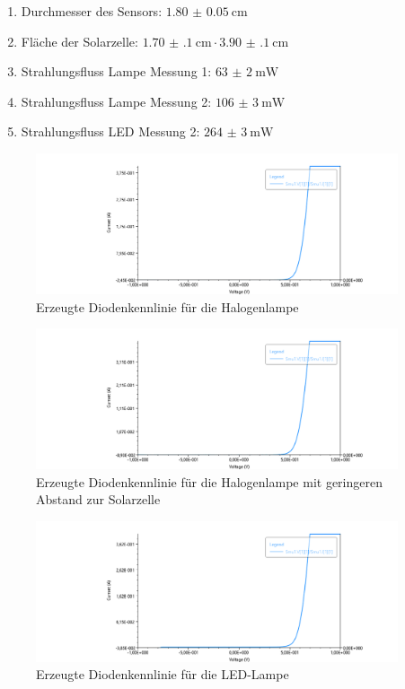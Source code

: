 \documentclass[12pt,english,ngerman]{scrartcl}
\begin{document}
\begin{enumerate}\label{enum:werte_solarzelle2}
	\item Durchmesser des Sensors: $\SI{1.80(5)}{\cm}$\cite{noauthor_2450_nodate}
	\item Fläche der Solarzelle: $\SI{1.70(10)}{\cm}\cdot \SI{3.90(10)}{\cm}$
	\item Strahlungsfluss Lampe Messung 1: $\SI{63(2)}{\milli\watt}$
	\item Strahlungsfluss Lampe Messung 2: $\SI{106(3)}{\milli\watt}$
	\item Strahlungsfluss LED Messung 2: $\SI{264(3)}{\milli\watt}$
\end{enumerate}

\begin{figure}[H]
	\centering
	\includegraphics[width=0.95\textwidth]{figures/helllampe.png}
	\caption{Erzeugte Diodenkennlinie für die Halogenlampe
	}\label{fig:mess_hellkennlinie_lampe}
\end{figure}

\begin{figure}[H]
	\centering
	\includegraphics[width=0.95\textwidth]{figures/helllampe2.png}
	\caption{Erzeugte Diodenkennlinie für die Halogenlampe mit geringeren Abstand zur Solarzelle
	}\label{fig:mess_hellkennlinie_lampe2}
\end{figure}

\begin{figure}[H]
	\centering
	\includegraphics[width=0.95\textwidth]{figures/hellled.png}
	\caption{Erzeugte Diodenkennlinie für die LED-Lampe
	}\label{fig:mess_hellkennlinie_led}
\end{figure}
\end{document}
